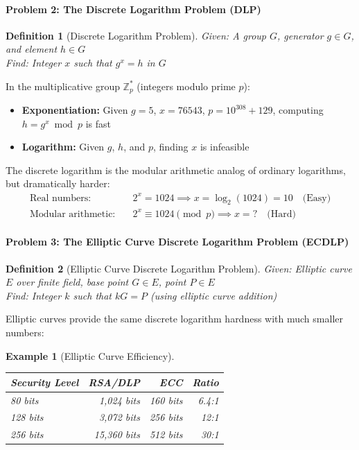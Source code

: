 \documentclass[11pt,a4paper]{article}
\newtheorem{definition}{Definition}
\newtheorem{example}{Example}
\begin{document}
\paragraph{Problem 2: The Discrete Logarithm Problem (DLP)}

\begin{definition}[Discrete Logarithm Problem]
Given: A group $G$, generator $g \in G$, and element $h \in G$\\
Find: Integer $x$ such that $g^x = h$ in $G$
\end{definition}

In the multiplicative group $\mathbb{Z}_p^*$ (integers modulo prime $p$):
\begin{itemize}
    \item \textbf{Exponentiation:} Given $g = 5$, $x = 76543$, $p = 10^{308} + 129$, computing $h = g^x \bmod p$ is fast
    \item \textbf{Logarithm:} Given $g$, $h$, and $p$, finding $x$ is infeasible
\end{itemize}

The discrete logarithm is the modular arithmetic analog of ordinary logarithms, but dramatically harder:
\begin{align}
\text{Real numbers:} \quad & 2^x = 1024 \implies x = \log_2(1024) = 10 \quad \text{(Easy)}\\
\text{Modular arithmetic:} \quad & 2^x \equiv 1024 \pmod{p} \implies x = ? \quad \text{(Hard)}
\end{align}

\paragraph{Problem 3: The Elliptic Curve Discrete Logarithm Problem (ECDLP)}

\begin{definition}[Elliptic Curve Discrete Logarithm Problem]
Given: Elliptic curve $E$ over finite field, base point $G \in E$, point $P \in E$\\
Find: Integer $k$ such that $kG = P$ (using elliptic curve addition)
\end{definition}

Elliptic curves provide the same discrete logarithm hardness with much smaller numbers:

\begin{example}[Elliptic Curve Efficiency]
\begin{center}
\begin{tabular}{|l|r|r|r|}
\hline
\textbf{Security Level} & \textbf{RSA/DLP} & \textbf{ECC} & \textbf{Ratio} \\
\hline
80 bits & 1,024 bits & 160 bits & 6.4:1 \\
128 bits & 3,072 bits & 256 bits & 12:1 \\
256 bits & 15,360 bits & 512 bits & 30:1 \\
\hline
\end{tabular}
\end{center}
\end{example}
\end{document}
